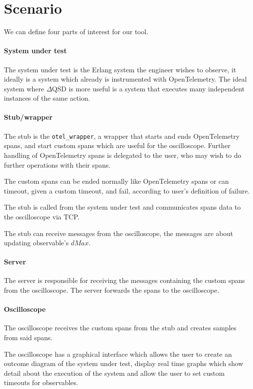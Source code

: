 \section{Scenario}
    We can define four parts of interest for our tool.
    \paragraph{System under test} The system under test is the Erlang system the engineer wishes to observe, it ideally is a system which already is instrumented with OpenTelemetry. The ideal system where $\Delta$QSD is more useful is a system that executes many independent instances of the same action.
    
    \paragraph{Stub/wrapper} The stub is the \texttt{otel\_wrapper}, a wrapper that starts and ends OpenTelemetry spans, and start custom spans which are useful for the oscilloscope. Further handling of OpenTelemetry spans is delegated to the user, who may wish to do further operations with their spans. 
   
    The custom spans can be ended normally like OpenTelemetry spans or can timeout, given a custom timeout, and fail, according to user's definition of failure. 
    
    The stub is called from the system under test and communicates spans data to the oscilloscope via TCP. 
    
    The stub can receive messages from the oscilloscope, the messages are about updating observable's $dMax$.
    
    \paragraph{Server} The server is responsible for receiving the messages containing the custom spans from the oscilloscope. The server forwards the spans to the oscilloscope.
    
    \paragraph{Oscilloscope} The oscilloscope receives the custom spans from the stub and creates samples from said spans. 
    
    The oscilloscope has a graphical interface which allows the user to create an outcome diagram of the system under test, display real time graphs which show detail about the execution of the system and allow the user to set custom timeouts for observables.

